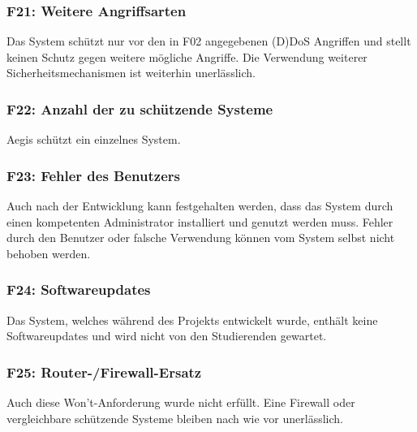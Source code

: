 \documentclass[../review_3.tex]{subfiles}
\begin{document}
\subsubsection{F21: Weitere Angriffsarten}
Das System schützt nur vor den in F02 angegebenen (D)DoS Angriffen und stellt keinen Schutz gegen weitere mögliche Angriffe. Die Verwendung weiterer Sicherheitsmechanismen ist weiterhin unerlässlich.

\subsubsection{F22: Anzahl der zu schützende Systeme}
Aegis schützt ein einzelnes System. %

\subsubsection{F23: Fehler des Benutzers}
Auch nach der Entwicklung kann festgehalten werden, dass das System durch einen kompetenten Administrator installiert und genutzt werden muss.
Fehler durch den Benutzer oder falsche Verwendung können vom System selbst nicht behoben werden.

\subsubsection{F24: Softwareupdates}
Das System, welches während des Projekts entwickelt wurde, enthält keine Softwareupdates und wird nicht von den Studierenden gewartet.

\subsubsection{F25: Router-/Firewall-Ersatz}
Auch diese Won't-Anforderung wurde nicht erfüllt. Eine Firewall oder vergleichbare schützende Systeme bleiben nach wie vor unerlässlich.
\end{document}
